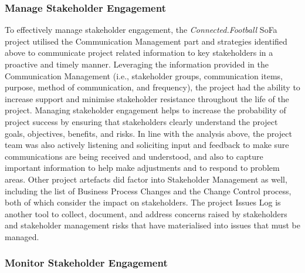 \subsubsection{Manage Stakeholder Engagement}
\label{sssec:manage_stakeholder_engagement}

To effectively manage stakeholder engagement, the \textit{Connected.Football} SoFa project utilised the Communication Management part and strategies identified above to communicate project related information to key stakeholders in a proactive and timely manner.  Leveraging the information provided in the Communication Management (i.e., stakeholder groups, communication items, purpose, method of communication, and frequency), the project had the ability to increase support and minimise stakeholder resistance throughout the life of the project.  Managing stakeholder engagement helps to increase the probability of project success by ensuring that stakeholders clearly understand the project goals, objectives, benefits, and risks. 
\newline
In line with the analysis above, the project team was also actively listening and soliciting input and feedback to make sure communications are being received and understood, and also to capture important information to help make adjustments and to respond to problem areas.
\newline
Other project artefacts did factor into Stakeholder Management as well, including the list of Business Process Changes and the Change Control process, both of which consider the impact on stakeholders.  The project Issues Log is another tool to collect, document, and address concerns raised by stakeholders and stakeholder management risks that have materialised into issues that must be managed.

\subsubsection{Monitor Stakeholder Engagement}
\label{sssec:monitor_stakeholder_engagement}

